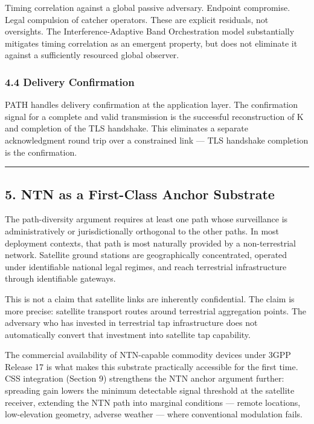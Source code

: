 \documentclass[
  11pt,
]{article}
\begin{document}
Timing correlation against a global passive adversary. Endpoint
compromise. Legal compulsion of catcher operators. These are explicit
residuals, not oversights. The Interference-Adaptive Band Orchestration
model substantially mitigates timing correlation as an emergent
property, but does not eliminate it against a sufficiently resourced
global observer.

\hypertarget{delivery-confirmation}{%
\subsubsection{4.4 Delivery Confirmation}\label{delivery-confirmation}}

PATH handles delivery confirmation at the application layer. The
confirmation signal for a complete and valid transmission is the
successful reconstruction of K and completion of the TLS handshake. This
eliminates a separate acknowledgment round trip over a constrained link
--- TLS handshake completion is the confirmation.

\begin{center}\rule{0.5\linewidth}{0.5pt}\end{center}

\hypertarget{ntn-as-a-first-class-anchor-substrate}{%
\subsection{5. NTN as a First-Class Anchor
Substrate}\label{ntn-as-a-first-class-anchor-substrate}}

The path-diversity argument requires at least one path whose
surveillance is administratively or jurisdictionally orthogonal to the
other paths. In most deployment contexts, that path is most naturally
provided by a non-terrestrial network. Satellite ground stations are
geographically concentrated, operated under identifiable national legal
regimes, and reach terrestrial infrastructure through identifiable
gateways.

This is not a claim that satellite links are inherently confidential.
The claim is more precise: satellite transport routes around terrestrial
aggregation points. The adversary who has invested in terrestrial tap
infrastructure does not automatically convert that investment into
satellite tap capability.

The commercial availability of NTN-capable commodity devices under 3GPP
Release 17 is what makes this substrate practically accessible for the
first time. CSS integration (Section 9) strengthens the NTN anchor
argument further: spreading gain lowers the minimum detectable signal
threshold at the satellite receiver, extending the NTN path into
marginal conditions --- remote locations, low-elevation geometry,
adverse weather --- where conventional modulation fails.
\end{document}
